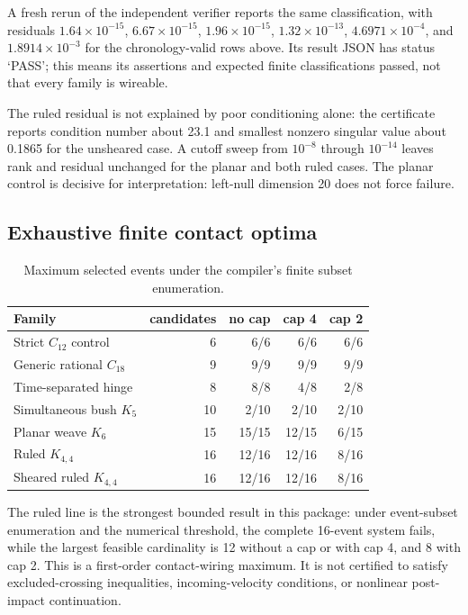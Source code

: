 \documentclass[11pt]{article}
\theoremstyle{definition}
\theoremstyle{remark}
\begin{document}
A fresh rerun of the independent verifier reports the same classification, with residuals $1.64\times10^{-15}$, $6.67\times10^{-15}$, $1.96\times10^{-15}$, $1.32\times10^{-13}$, $4.6971\times10^{-4}$, and $1.8914\times10^{-3}$ for the chronology-valid rows above. Its result JSON has status `PASS'; this means its assertions and expected finite classifications passed, not that every family is wireable.

The ruled residual is not explained by poor conditioning alone: the certificate reports condition number about 23.1 and smallest nonzero singular value about 0.1865 for the unsheared case. A cutoff sweep from $10^{-8}$ through $10^{-14}$ leaves rank and residual unchanged for the planar and both ruled cases. The planar control is decisive for interpretation: left-null dimension 20 does not force failure.

\subsection{Exhaustive finite contact optima}
\begin{table}[ht]
\centering\small
\caption{Maximum selected events under the compiler's finite subset enumeration.}\label{tab:optima}
\vspace{0.35em}
\begin{tabular}{@{}lrrrr@{}}
\toprule
Family & candidates & no cap & cap 4 & cap 2\\
\midrule
Strict $C_{12}$ control & 6 & 6/6 & 6/6 & 6/6\\
Generic rational $C_{18}$ & 9 & 9/9 & 9/9 & 9/9\\
Time-separated hinge & 8 & 8/8 & 4/8 & 2/8\\
Simultaneous bush $K_5$ & 10 & 2/10 & 2/10 & 2/10\\
Planar weave $K_6$ & 15 & 15/15 & 12/15 & 6/15\\
Ruled $K_{4,4}$ & 16 & 12/16 & 12/16 & 8/16\\
Sheared ruled $K_{4,4}$ & 16 & 12/16 & 12/16 & 8/16\\
\bottomrule
\end{tabular}
\end{table}

The ruled line is the strongest bounded result in this package: under event-subset enumeration and the numerical threshold, the complete 16-event system fails, while the largest feasible cardinality is 12 without a cap or with cap 4, and 8 with cap 2. This is a first-order contact-wiring maximum. It is not certified to satisfy excluded-crossing inequalities, incoming-velocity conditions, or nonlinear post-impact continuation.
\end{document}
